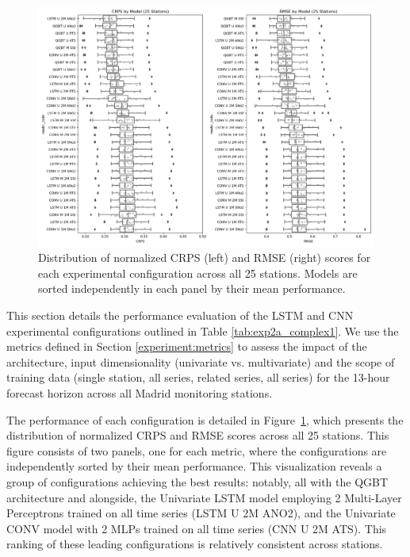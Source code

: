 \documentclass[12pt,a4paper]{book}
\begin{document}
\begin{figure}[h!]
  \centering
  \includegraphics[width=\textwidth]{exp2a_rmse_crps.png} 
  \caption{Distribution of normalized CRPS (left) and RMSE (right) scores for each experimental configuration across all 25 stations. Models are sorted independently in each panel by their mean performance.}
  \label{fig:exp2a_rmse_crps_boxplot}
\end{figure}

This section details the performance evaluation of the LSTM and CNN experimental configurations outlined in Table \ref{tab:exp2a_complex1}. We use the metrics defined in Section \ref{experiment:metrics} to assess the impact of the architecture, input dimensionality (univariate vs. multivariate) and the scope of training data (single station, all \no{} series, related series, all series) for the 13-hour forecast horizon across all Madrid monitoring stations.

The performance of each configuration is detailed in Figure~\ref{fig:exp2a_rmse_crps_boxplot}, which presents the distribution of normalized CRPS and RMSE scores across all 25 stations. This figure consists of two panels, one for each metric, where the configurations are independently sorted by their mean performance. This visualization reveals a group of configurations achieving the best results: notably, all with the QGBT architecture and alongside, the Univariate LSTM model employing 2 Multi-Layer Perceptrons trained on all \no{} time series (LSTM U 2M ANO2), and the Univariate CONV model with 2 MLPs trained on all time series (CNN U 2M ATS). This ranking of these leading configurations is relatively consistent across stations.
\end{document}
